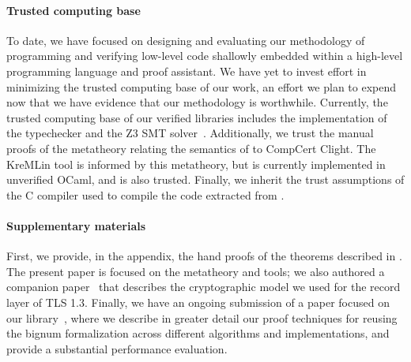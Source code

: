 %


\paragraph*{Trusted computing base} To date,
we have focused on designing and evaluating our methodology of
programming and verifying low-level code shallowly embedded within a
high-level programming language and proof assistant.
%
We have yet to invest effort in minimizing the trusted computing base
of our work, an effort we plan to expend now that we have evidence
that our methodology is worthwhile.
%
Currently, the trusted computing base of our verified libraries
includes the implementation of the \fstar typechecker and the Z3 SMT
solver~\citep{MouraB08}.
%
Additionally, we trust the manual proofs of the metatheory relating
the semantics of \lamstar to CompCert Clight. The KreMLin tool is
informed by this metatheory, but is currently implemented in
unverified OCaml, and is also trusted.
%
Finally, we inherit the trust assumptions of the C compiler used to
compile the code extracted from \lowstar.

\paragraph*{Supplementary materials}
First, we provide, in the appendix, the hand proofs
of the theorems described in .
%
The present paper is focused on the metatheory and tools; we also authored a
companion paper~\cite{record} that describes the cryptographic model we
used for the record layer of TLS 1.3.
%
Finally, we have an ongoing submission of a paper focused on our
\haclstar library~\cite{haclstar}, where we
describe in greater detail our
proof techniques for reusing the bignum formalization across different
algorithms and implementations, and provide a substantial performance
evaluation.

